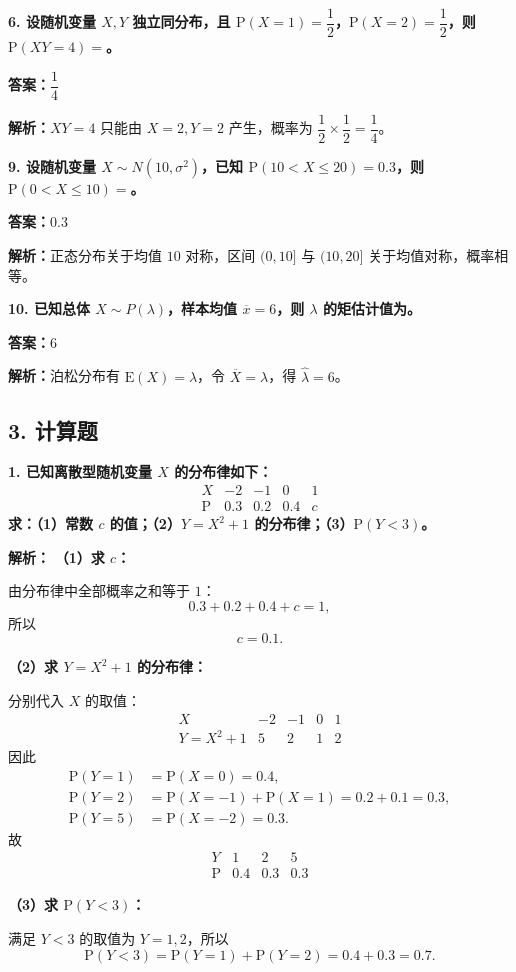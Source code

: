 ﻿\documentclass[UTF8,11pt,a4paper]{ctexart}
\newcommand{\Pp}{\mathrm{P}}
\newcommand{\E}{\mathrm{E}}
\newcommand{\Ans}[1]{\par\textbf{答案：}#1\par}
\newcommand{\Ana}[1]{\par\textbf{解析：}#1\par\medskip}
\newcommand{\Q}[1]{\par\textbf{#1}\par}
\begin{document}
\Q{6. 设随机变量 $X,Y$ 独立同分布，且 $\Pp(X=1)=\dfrac12$，$\Pp(X=2)=\dfrac12$，则 $\Pp(XY=4)=$\underline{\hspace{2cm}}。}
\Ans{$\dfrac14$}
\Ana{$XY=4$ 只能由 $X=2,Y=2$ 产生，概率为 $\dfrac12\times\dfrac12=\dfrac14$。}

\Q{9. 设随机变量 $X\sim N(10,\sigma^2)$，已知 $\Pp(10<X\le20)=0.3$，则 $\Pp(0<X\le10)=$\underline{\hspace{2cm}}。}
\Ans{$0.3$}
\Ana{正态分布关于均值 $10$ 对称，区间 $(0,10]$ 与 $(10,20]$ 关于均值对称，概率相等。}

\Q{10. 已知总体 $X\sim P(\lambda)$，样本均值 $\overline x=6$，则 $\lambda$ 的矩估计值为\underline{\hspace{2cm}}。}
\Ans{$6$}
\Ana{泊松分布有 $\E(X)=\lambda$，令 $\overline X=\lambda$，得 $\hat\lambda=6$。}

\subsection*{3. 计算题}
\Q{1. 已知离散型随机变量 $X$ 的分布律如下：
\[
\begin{array}{c|cccc}X&-2&-1&0&1\\\hline \Pp&0.3&0.2&0.4&c\end{array}
\]
求：（1）常数 $c$ 的值；（2）$Y=X^2+1$ 的分布律；（3）$\Pp(Y<3)$。}
\Ana{
\textbf{（1）求 $c$：}

由分布律中全部概率之和等于 $1$：
\[
0.3+0.2+0.4+c=1,
\]
所以
\[
c=0.1.
\]

\textbf{（2）求 $Y=X^2+1$ 的分布律：}

分别代入 $X$ 的取值：
\[
\begin{array}{c|cccc}
X&-2&-1&0&1\\\hline
Y=X^2+1&5&2&1&2
\end{array}
\]
因此
\[
\begin{aligned}
\Pp(Y=1)&=\Pp(X=0)=0.4,\\
\Pp(Y=2)&=\Pp(X=-1)+\Pp(X=1)=0.2+0.1=0.3,\\
\Pp(Y=5)&=\Pp(X=-2)=0.3.
\end{aligned}
\]
故
\[
\begin{array}{c|ccc}
Y&1&2&5\\\hline
\Pp&0.4&0.3&0.3
\end{array}
\]

\textbf{（3）求 $\Pp(Y<3)$：}

满足 $Y<3$ 的取值为 $Y=1,2$，所以
\[
\Pp(Y<3)=\Pp(Y=1)+\Pp(Y=2)=0.4+0.3=0.7.
\]
}
\end{document}
